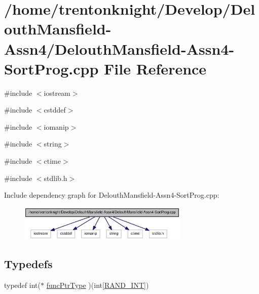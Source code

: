 \hypertarget{_delouth_mansfield-_assn4-_sort_prog_8cpp}{
\section{/home/trentonknight/Develop/DelouthMansfield-\/Assn4/DelouthMansfield-\/Assn4-\/SortProg.cpp File Reference}
\label{_delouth_mansfield-_assn4-_sort_prog_8cpp}
}
{\ttfamily \#include $<$iostream$>$}\par
{\ttfamily \#include $<$cstddef$>$}\par
{\ttfamily \#include $<$iomanip$>$}\par
{\ttfamily \#include $<$string$>$}\par
{\ttfamily \#include $<$ctime$>$}\par
{\ttfamily \#include $<$stdlib.h$>$}\par
Include dependency graph for DelouthMansfield-\/Assn4-\/SortProg.cpp:\nopagebreak
\begin{figure}[H]
\begin{center}
\leavevmode
\includegraphics[width=230pt]{_delouth_mansfield-_assn4-_sort_prog_8cpp__incl}
\end{center}
\end{figure}
\subsection*{Typedefs}
\begin{DoxyCompactItemize}
\item 
typedef int($\ast$ \hyperlink{_delouth_mansfield-_assn4-_sort_prog_8cpp_ae2987d0004dea58df8c833858c0fb370}{funcPtrType} )(int\mbox{[}\hyperlink{_mansfield_delouth-_assn4-_sort_prog_8cpp_a134c2ba56ae9ba89c77a5c0dba9f2124}{RAND\_\-INT}\mbox{]})
\end{DoxyCompactItemize}
